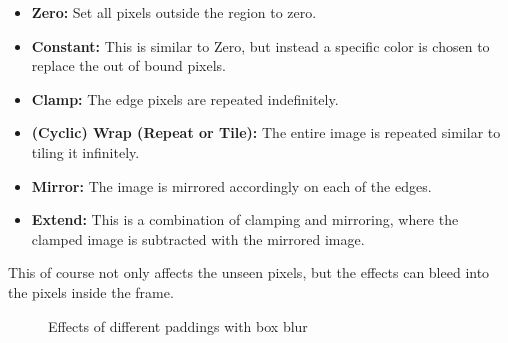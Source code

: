 \documentclass[twoside,a4paper,article]{combine}
\begin{document}
\begin{itemize}
    \item \textbf{Zero:} Set all pixels outside the region to zero.
    \item \textbf{Constant:} This is similar to Zero, but instead a specific color is chosen to replace the out of bound pixels.
    \item \textbf{Clamp:} The edge pixels are repeated indefinitely.
    \item \textbf{(Cyclic) Wrap (Repeat or Tile):} The entire image is repeated similar to tiling it infinitely.
    \item \textbf{Mirror:} The image is mirrored accordingly on each of the edges.
    \item \textbf{Extend:} This is a combination of clamping and mirroring, where the clamped image is subtracted with the mirrored image.
\end{itemize}\label{chap:padding}

This of course not only affects the unseen pixels, but the effects can bleed into the pixels inside the frame.
\begin{minipage}{\textwidth}\begin{figure}[H]
    \centering
    \caption{Effects of different paddings with box blur}
    \label{fig:boxBlur_borders}
\end{figure}\end{minipage}
\end{document}
